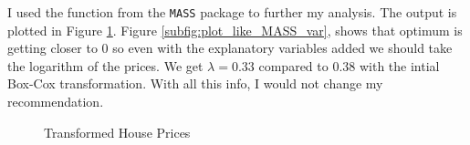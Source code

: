 I used the function from the \texttt{MASS} package to further my analysis.
The output is plotted in Figure \ref{fig:plot_like_MASS}. Figure \ref{subfig:plot_like_MASS_var}, 
shows that optimum is getting closer to 0 so even with the explanatory variables added%
we should take the logarithm of the prices. We get $\lambda = 0.33$ compared to 0.38 with the intial 
Box-Cox transformation. With all this info, I would not change my recommendation.
\begin{figure}[!ht]
\hfill
{}

\caption{ Transformed House Prices}
\label{fig:plot_like_MASS}
\end{figure}










%
